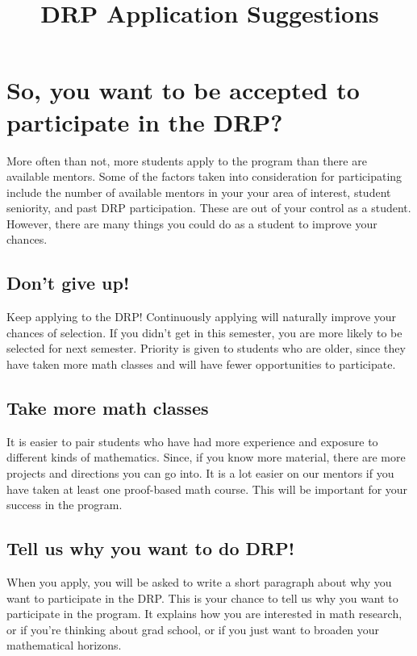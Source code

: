 \documentclass{article}
\begin{document}
\title{DRP Application Suggestions}

\maketitle


\section{So, you want to be accepted to participate in the DRP?}

More often than not, more students apply to the program than there are available mentors. Some of
the factors taken into consideration for participating include the number of available mentors in
your your area of interest, student seniority, and past DRP participation. These are out of your
control as a student. However, there are many things you could do as a student to improve your
chances.


\subsection{Don't give up!}

Keep applying to the DRP! Continuously applying will naturally improve your chances of selection. If
you didn't get in this semester, you are more likely to be selected for next semester. 
Priority is given to students who are older, since they have taken more math classes and will have
fewer opportunities to participate. 

\subsection{Take more math classes}

It is easier to pair students who have had more experience and exposure to different kinds of
mathematics. Since, if you know more material, there are more projects and directions you can go
into. It is a lot easier on our mentors if you have taken at least one proof-based math course.
This will be important for your success in the program.

\subsection{Tell us why you want to do DRP!}

When you apply, you will be asked to write a short paragraph about why you want to participate in
the DRP. This is your chance to tell us why you want to participate in the program. It explains how
you are interested in math research, or if you're thinking about grad school, or if you just want to
broaden your mathematical horizons. 
\end{document}
